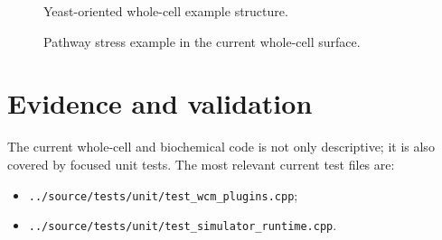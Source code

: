 \begin{figure}[htbp]
\centering
\caption{Yeast-oriented whole-cell example structure.}
\label{fig:yeast-mvp-structure}
\end{figure}

\begin{figure}[htbp]
\centering
\caption{Pathway stress example in the current whole-cell surface.}
\label{fig:pathway-stress-example}
\end{figure}

\section{Evidence and validation}

The current whole-cell and biochemical code is not only descriptive; it is also
covered by focused unit tests. The most relevant current test files are:
\begin{itemize}
\item \texttt{../source/tests/unit/test\_wcm\_plugins.cpp};
\item \texttt{../source/tests/unit/test\_simulator\_runtime.cpp}.
\end{itemize}

